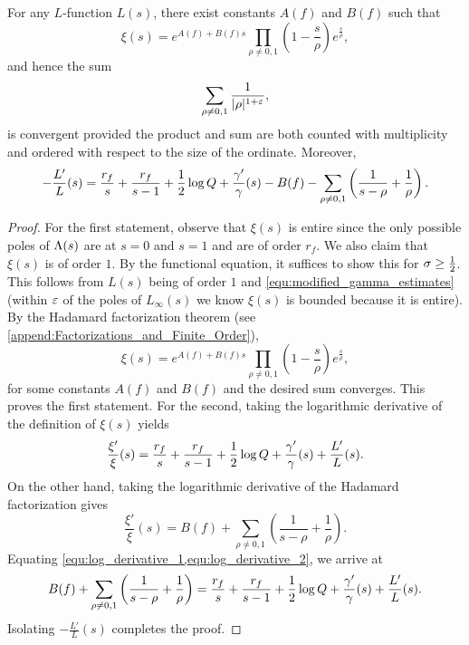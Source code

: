 \documentclass[12pt]{article}
\begin{document}
    \begin{proposition}\label{prop:explicit_formula_log_derivative}
      For any \(L\)-function \(L(s)\), there exist constants \(A(f)\) and \(B(f)\) such that
      \[
        \xi(s) = e^{A(f)+B(f)s}\prod_{\rho \neq 0,1}\left(1-\frac{s}{\rho}\right)e^{\frac{s}{\rho}},
      \]
      and hence the sum
      \[
        \sum_{\rho \neq 0,1}\frac{1}{|\rho|^{1+\varepsilon}},
      \]
      is convergent provided the product and sum are both counted with multiplicity and ordered with respect to the size of the ordinate. Moreover,
      \[
        -\frac{L'}{L}(s) = \frac{r_{f}}{s}+\frac{r_{f}}{s-1}+\frac{1}{2}\log{Q}+\frac{\gamma'}{\gamma}(s)-B(f)-\sum_{\rho \neq 0,1}\left(\frac{1}{s-\rho}+\frac{1}{\rho}\right).
      \] 
    \end{proposition}
    \begin{proof}
      For the first statement, observe that \(\xi(s)\) is entire since the only possible poles of \(\Lambda(s)\) are at \(s = 0\) and \(s = 1\) and are of order \(r_{f}\). We also claim that \(\xi(s)\) is of order \(1\). By the functional equation, it suffices to show this for \(\sigma \ge \frac{1}{2}\). This follows from \(L(s)\) being of order \(1\) and \cref{equ:modified_gamma_estimates} (within \(\varepsilon\) of the poles of \(L_{\infty}(s)\) we know \(\xi(s)\) is bounded because it is entire). By the Hadamard factorization theorem (see \cref{append:Factorizations_and_Finite_Order}),
       \[
        \xi(s) = e^{A(f)+B(f)s}\prod_{\rho \neq 0,1}\left(1-\frac{s}{\rho}\right)e^{\frac{s}{\rho}},
      \]
      for some constants \(A(f)\) and \(B(f)\) and the desired sum converges. This proves the first statement. For the second, taking the logarithmic derivative of the definition of \(\xi(s)\) yields
      \begin{equation}\label{equ:log_derivative_1}
        \frac{\xi'}{\xi}(s) = \frac{r_{f}}{s}+\frac{r_{f}}{s-1}+\frac{1}{2}\log{Q}+\frac{\gamma'}{\gamma}(s)+\frac{L'}{L}(s).
      \end{equation}
      On the other hand, taking the logarithmic derivative of the Hadamard factorization gives
      \begin{equation}\label{equ:log_derivative_2}
        \frac{\xi'}{\xi}(s) = B(f)+\sum_{\rho \neq 0,1}\left(\frac{1}{s-\rho}+\frac{1}{\rho}\right).
      \end{equation}
      Equating \cref{equ:log_derivative_1,equ:log_derivative_2}, we arrive at
      \[
        B(f)+\sum_{\rho \neq 0,1}\left(\frac{1}{s-\rho}+\frac{1}{\rho}\right) = \frac{r_{f}}{s}+\frac{r_{f}}{s-1}+\frac{1}{2}\log{Q}+\frac{\gamma'}{\gamma}(s)+\frac{L'}{L}(s).
      \]
      Isolating \(-\frac{L'}{L}(s)\) completes the proof.
    \end{proof}
\end{document}
